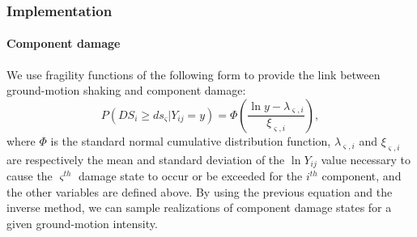 \subsubsection{Implementation}
\paragraph{Component damage}



We use fragility functions of the following form to provide the link between ground-motion shaking and component damage:
\begin{equation}
P(DS_i \geq ds_\varsigma |Y_{ij} = y) = \Phi \left( \frac{\ln y - \lambda_{\varsigma, i}}{\xi_{\varsigma,i}} \right),
\label{eq:dsfull}
\end{equation}
where $\Phi$ is the standard normal cumulative distribution function, $\lambda_{\varsigma,i}$ and $\xi_{\varsigma,i}$ are respectively the mean and standard deviation of the $\ln Y_{ij}$ value necessary to cause the $\varsigma^{th}$ damage state to occur or be exceeded for the $i^{th}$ component, and the other variables are defined above. By using the previous equation and the inverse method, we can sample realizations of component damage states for a given ground-motion intensity.
%
%

